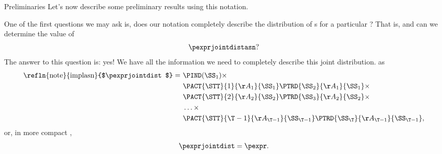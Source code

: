 \begin{part}{Preliminaries}
  Let's now describe some preliminary results using this notation.

  One of the first questions we may ask is, does our notation completely describe
  the distribution of \run{}s for a particular \str?
  That is, 
  and
  can we determine the value of
  $$\pexprjointdistasn?$$
  The answer to this question is: yes! 
  We have all the information we need 
  to completely describe 
  this joint distribution. 
   as
  \begin{align*}
    \text{\refln{note}{implasn}{$\pexprjointdist$}}
    =\ &\PIND(\SS_1)\times\\
       &\PACT{\STT}{1}{\AA_1}{\SS_1}
        \PTRD{\SS_2}{\AA_1}{\SS_1}\times\\
       &\PACT{\STT}{2}{\AA_2}{\SS_2}
        \PTRD{\SS_3}{\AA_2}{\SS_2}\times\\
       &\ldots\times\\
       &\PACT{\STT}{{\T - 1}}{\AA_{\T - 1}}{\SS_{\T - 1}}
        \PTRD{\SS_\T}{\AA_{\T - 1}}{\SS_{\T - 1}},
  \end{align*}
  or, in more compact ,
  $$\pexprjointdist = \pexpr.$$
\end{part}
